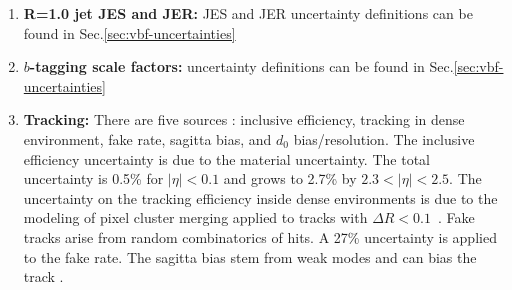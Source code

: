 \begin{enumerate}
\item \textbf{R=1.0 jet JES and JER:} JES and JER uncertainty definitions can be found in Sec.\ref{sec:vbf-uncertainties}
    

  \item \textbf{$b$-tagging scale factors:} \btagging uncertainty definitions can be found in Sec.\ref{sec:vbf-uncertainties}
  
  
  \item \textbf{Tracking:} There are five sources : inclusive efficiency, tracking in dense environment, fake rate, sagitta bias, and $d_0$ bias/resolution. The inclusive efficiency uncertainty is due to the material uncertainty.  The total uncertainty is 0.5\% for $|\eta| < 0.1$ and grows to 2.7\% by $2.3 < |\eta| < 2.5$.  The uncertainty on the tracking efficiency inside dense environments is due to the modeling of pixel cluster merging applied to tracks with $\Delta R < 0.1$~\cite{Aaboud:2017all,ATL-PHYS-PUB-2016-007,ATL-PHYS-PUB-2017-016}. Fake tracks arise from random combinatorics of hits. A 27\% uncertainty is applied to the fake rate. The sagitta bias stem from weak modes and can bias the track \pt. %
  

\end{enumerate}
